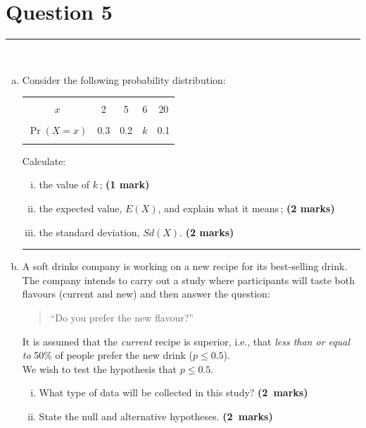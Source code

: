 \documentclass[12pt]{article}
\begin{document}
\section*{Question 5 }
\noindent\rule{\linewidth}{1pt}
\quad\\[-0.5cm]
\begin{enumerate}[a)]
\item Consider the following probability distribution:
\begin{center}
\begin{tabular}{|c|cccc|}
\hline
&&&&\\[-0.4cm]
$x$        & 2 & 5 & 6 & 20 \\
\hline
&&&&\\[-0.4cm]
$\Pr(X=x)$ & 0.3 & 0.2 & $k$ & 0.1 \\
\hline
\multicolumn{5}{c}{}
\end{tabular}
\end{center}
Calculate:
    \begin{enumerate}[i)]\itemsep0.2cm
    \item the value of $k$\,; \hfill{\scriptsize \bf (1 mark)}
    \item the expected value, $E(X)$, and explain what it means\,; \hfill{\scriptsize \bf (2 marks)}
    \item the standard deviation, $Sd(X)$. \hfill{\scriptsize \bf (2 marks)}
    \end{enumerate}
\begin{center}\noindent\rule{0.4\linewidth}{0.5pt}\end{center}
\item A soft drinks company is working on a new recipe for its best-selling drink. The company intends to carry out a study where participants will taste both flavours (current and new) and then answer the question:
    \begin{quotation}
    ``Do you prefer the new flavour?''
    \end{quotation}
    It is assumed that the \emph{current} recipe is superior, i.e., that \emph{less than or equal to} 50\% of people prefer the new drink ($p \le 0.5$).\\[0.4cm]
    We wish to test the hypothesis that $p \le 0.5$.\\[-0.4cm]
    \begin{enumerate}[i)]\itemsep0.3cm
    \item What type of data will be collected in this study? \hfill{\mbox{\scriptsize \bf (2 marks)}}
    \item State the null and alternative hypotheses. \hfill{\mbox{\scriptsize \bf (2 marks)}}

\end{enumerate}
\end{enumerate}
\end{document}
